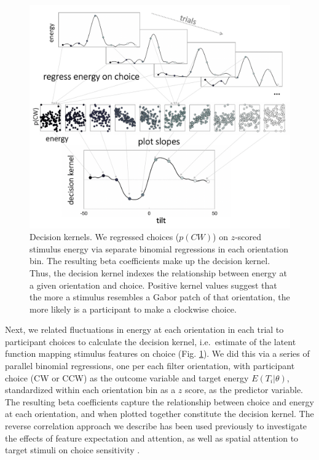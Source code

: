 \documentclass[a4paper, nobind]{templates/ociamthesis}
\begin{document}
\begin{figure}

{\centering \includegraphics[width=0.8\linewidth]{figures/distr-methods-kernels} 

}

\caption[Reverse correlation analysis, Decision kernels]{Decision kernels. We regressed choices ($p(CW)$) on $z$-scored stimulus energy via separate binomial regressions in each orientation bin. The resulting beta coefficients make up the decision kernel. Thus, the decision kernel indexes the relationship between energy at a given orientation and choice. Positive kernel values suggest that the more a stimulus resembles a Gabor patch of that orientation, the more likely is a participant to make a clockwise choice.}\label{fig:distr-methods-kernels}
\end{figure}

Next, we related fluctuations in energy at each orientation in each trial to participant choices to calculate the decision kernel, i.e.~estimate of the latent function mapping stimulus features on choice (Fig. \ref{fig:distr-methods-kernels}). We did this via a series of parallel binomial regressions, one per each filter orientation, with participant choice (CW or CCW) as the outcome variable and target energy \(E(T_i|\theta)\), standardized within each orientation bin as a \(z\) score, as the predictor variable. The resulting beta coefficients capture the relationship between choice and energy at each orientation, and when plotted together constitute the decision kernel. The reverse correlation approach we describe has been used previously to investigate the effects of feature expectation and attention, as well as spatial attention to target stimuli on choice sensitivity \autocite{wyart2012,barbot2014,cheadle2015}.
\end{document}
